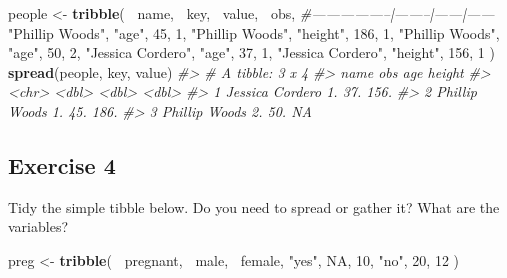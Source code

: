 \documentclass[]{book}
\newenvironment{Shaded}{\begin{snugshade}}{\end{snugshade}}
\newcommand{\CommentTok}[1]{\textcolor[rgb]{0.56,0.35,0.01}{\textit{#1}}}
\newcommand{\DecValTok}[1]{\textcolor[rgb]{0.00,0.00,0.81}{#1}}
\newcommand{\KeywordTok}[1]{\textcolor[rgb]{0.13,0.29,0.53}{\textbf{#1}}}
\newcommand{\NormalTok}[1]{#1}
\newcommand{\OperatorTok}[1]{\textcolor[rgb]{0.81,0.36,0.00}{\textbf{#1}}}
\newcommand{\OtherTok}[1]{\textcolor[rgb]{0.56,0.35,0.01}{#1}}
\newcommand{\StringTok}[1]{\textcolor[rgb]{0.31,0.60,0.02}{#1}}
\theoremstyle{definition}
\theoremstyle{definition}
\theoremstyle{definition}
\theoremstyle{remark}
\begin{document}
\begin{Shaded}
\begin{Highlighting}[]
\NormalTok{people <-}\StringTok{ }\KeywordTok{tribble}\NormalTok{(}
  \OperatorTok{~}\NormalTok{name,             }\OperatorTok{~}\NormalTok{key,    }\OperatorTok{~}\NormalTok{value, }\OperatorTok{~}\NormalTok{obs,}
  \CommentTok{#-----------------|--------|------|------}
  \StringTok{"Phillip Woods"}\NormalTok{,   }\StringTok{"age"}\NormalTok{,       }\DecValTok{45}\NormalTok{, }\DecValTok{1}\NormalTok{,}
  \StringTok{"Phillip Woods"}\NormalTok{,   }\StringTok{"height"}\NormalTok{,   }\DecValTok{186}\NormalTok{, }\DecValTok{1}\NormalTok{,}
  \StringTok{"Phillip Woods"}\NormalTok{,   }\StringTok{"age"}\NormalTok{,       }\DecValTok{50}\NormalTok{, }\DecValTok{2}\NormalTok{,}
  \StringTok{"Jessica Cordero"}\NormalTok{, }\StringTok{"age"}\NormalTok{,       }\DecValTok{37}\NormalTok{, }\DecValTok{1}\NormalTok{,}
  \StringTok{"Jessica Cordero"}\NormalTok{, }\StringTok{"height"}\NormalTok{,   }\DecValTok{156}\NormalTok{, }\DecValTok{1}
\NormalTok{)}
\KeywordTok{spread}\NormalTok{(people, key, value)}
\CommentTok{#> # A tibble: 3 x 4}
\CommentTok{#>   name              obs   age height}
\CommentTok{#>   <chr>           <dbl> <dbl>  <dbl>}
\CommentTok{#> 1 Jessica Cordero    1.   37.   156.}
\CommentTok{#> 2 Phillip Woods      1.   45.   186.}
\CommentTok{#> 3 Phillip Woods      2.   50.    NA}
\end{Highlighting}
\end{Shaded}

\hypertarget{exercise-4-12}{%
\subsection{Exercise 4}\label{exercise-4-12}}

Tidy the simple tibble below. Do you need to spread or gather it? What
are the variables?

\begin{Shaded}
\begin{Highlighting}[]
\NormalTok{preg <-}\StringTok{ }\KeywordTok{tribble}\NormalTok{(}
  \OperatorTok{~}\NormalTok{pregnant, }\OperatorTok{~}\NormalTok{male, }\OperatorTok{~}\NormalTok{female,}
  \StringTok{"yes"}\NormalTok{,     }\OtherTok{NA}\NormalTok{,    }\DecValTok{10}\NormalTok{,}
  \StringTok{"no"}\NormalTok{,      }\DecValTok{20}\NormalTok{,    }\DecValTok{12}
\NormalTok{)}
\end{Highlighting}
\end{Shaded}
\end{document}
